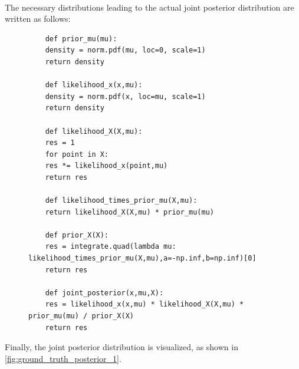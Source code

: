 \documentclass{article}
\begin{document}
\\
The necessary distributions leading to the actual joint posterior distribution are written as follows:
\begin{figure}[h]
	\begin{lstlisting}
	def prior_mu(mu):
	density = norm.pdf(mu, loc=0, scale=1)
	return density

	def likelihood_x(x,mu):
	density = norm.pdf(x, loc=mu, scale=1)
	return density

	def likelihood_X(X,mu):
	res = 1
	for point in X:
	res *= likelihood_x(point,mu)
	return res

	def likelihood_times_prior_mu(X,mu):
	return likelihood_X(X,mu) * prior_mu(mu)

	def prior_X(X):
	res = integrate.quad(lambda mu: likelihood_times_prior_mu(X,mu),a=-np.inf,b=np.inf)[0]
	return res

	def joint_posterior(x,mu,X):
	res = likelihood_x(x,mu) * likelihood_X(X,mu) * prior_mu(mu) / prior_X(X)
	return res
	\end{lstlisting}
	\label{fig:groundtruth_example_code_distributions}
\end{figure}
Finally, the joint posterior distribution is visualized, as shown in \ref{fig:ground_truth_posterior_1}.
\end{document}
